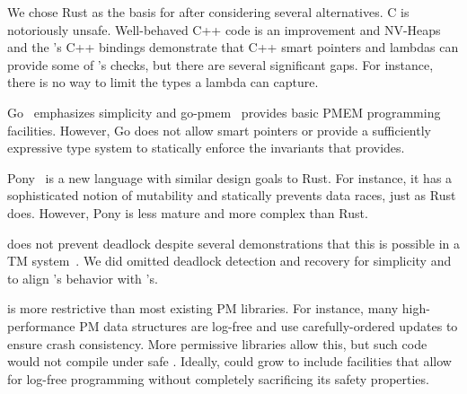 
 We chose Rust as the basis for \this{} after
considering several alternatives.  C is notoriously unsafe.  Well-behaved C++ code
is an improvement and NV-Heaps and the 's C++ bindings demonstrate that C++
smart pointers and lambdas can provide some of \this{}'s checks, but there are
several significant gaps.  For instance, there is no way to limit the types a
lambda can capture.

Go~\cite{golang} emphasizes simplicity and go-pmem~\cite{gopmem} provides basic
PMEM programming facilities.  However, Go does not allow smart pointers or
provide a sufficiently expressive type system to statically enforce the
invariants that \this{} provides.

Pony~\cite{pony} is a new language with similar design goals to Rust.  For
instance, it has a sophisticated notion of mutability and statically prevents
data races, just as Rust does.  However, Pony is less mature and more complex
than Rust.



 \This{} does not prevent deadlock despite several
demonstrations that this is possible in a TM
system~\cite{convoider,grace,tm2c,stmlock}.  We did omitted deadlock detection and
recovery for simplicity and to align 's behavior with 's.
  
 \This{} is more restrictive than most
existing PM libraries.  For instance, many high-performance PM data structures
are log-free and use carefully-ordered updates to ensure crash consistency.
More permissive libraries allow this, but such code would not compile under
safe \this{}.  Ideally, \this{} could grow to include
 facilities that allow for log-free programming without completely
sacrificing its safety properties.





